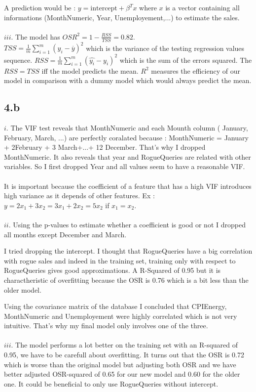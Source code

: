 \documentclass{article}
\begin{document}
    A prediction would be  : $y =\text{intercept} + \beta^Tx$ where $x$ is a vector containing all informations (MonthNumeric, Year, Unemployement,...) to estimate the sales.
    \\\\
    $iii$.
    The model has $OSR^2 = 1- \frac{RSS}{TSS} = 0.82$.\\
     $TSS = \frac{1}{m}\sum\limits_{i=1}^m (y_i-\overline{y})^2$ which is the variance of the testing regression values sequence. 
     $RSS =  \frac{1}{m}\sum\limits_{i=1}^m(\hat{y_i}-y_i)^2$ which is the sum of the errors squared. The $RSS = TSS$ iff the model predicts the mean. $R^2$ measures the efficiency of our model in comparison with a dummy model which would always predict the mean.
    \subsection*{4.b}
    $i$. The VIF test reveals that MonthNumeric and each Mounth column (
     January, February, March, ...) are perfectly coralated because :
     MonthNumeric = January + 2February + 3 March+...+ 12 December.
     That's why I dropped MonthNumeric. It also reveals that year and RogueQueries are related with other variables. 
     So I first dropped Year and all values seem to have a reasonable VIF.
    \\\\
    It is important because the coefficient of a feature that has a high VIF introduces high variance as it depends of other features. Ex : $y = 2x_1 + 3x_2 = 3x_1 + 2x_2 = 5x_2$ if $x_1=x_2$.
    \\\\
    $ii$.
    Using the p-values to estimate whether a coefficient is good or not I dropped all months except December and March. 

    I tried dropping the intercept. I thought that RogueQueries have a big correlation with rogue sales and indeed in the training set,
    training only with respect to RogueQueries gives good approximations. A R-Squared of 0.95 but it is charactheristic of overfitting because 
    the OSR is 0.76 which is a bit less than the older model.
    
    Using the covariance matrix of the database I concluded that CPIEnergy, MonthNumeric and Unemployement were highly correlated which is not very intuitive.
    That's why my final model only involves one of the three.
    \\\\
    $iii$.
    The model performs a lot better on the training set with an R-squared of 0.95, we have to be carefull about overfitting.
    It turns out that the OSR is 0.72 which is worse than the original model but adjusting both OSR
    and we have better adjusted OSR-squared of 0.65 for our new model and 0.60 for the older one. It could be beneficial
    to only use RogueQueries without intercept.
\end{document}
